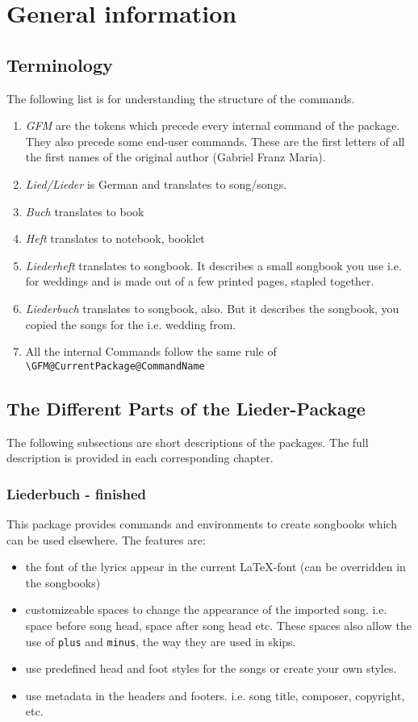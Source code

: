 \documentclass[12pt,a4paper]{scrreprt}
\begin{document}
\chapter{General information}
\section{Terminology}
The following list is for understanding the structure of the commands.
\begin{enumerate}
\item \emph{GFM} are the tokens which precede every internal command of the package. They also precede some end-user commands. These are the first letters of all the first names of the original author (Gabriel Franz Maria).
\item \emph{Lied/Lieder} is German and translates to song/songs.
\item \emph{Buch} translates to book
\item \emph{Heft} translates to notebook, booklet
\item \emph{Liederheft} translates to songbook. It describes a small songbook you use i.e. for weddings and is made out of a few printed pages, stapled together.
\item \emph{Liederbuch} translates to songbook, also. But it describes the songbook, you copied the songs for the  i.e. wedding from.
\item All the internal Commands follow the same rule of \verb+\GFM@CurrentPackage@CommandName+
\end{enumerate}





\section{The Different Parts of the Lieder-Package}
The following subsections are short descriptions of the packages. The full description is provided in each corresponding chapter.
\subsection{Liederbuch - finished} 
This package provides commands and environments to create songbooks which can be used elsewhere. The features are:
\begin{itemize}
\item the font of the lyrics appear in the current \LaTeX -font (can be overridden in the songbooks)
\item customizeable spaces to change the appearance of the imported song. i.e. space before song head, space after song head etc. These spaces also allow the use of \verb+plus+ and \verb+minus+, the way they are used in skips.
\item use predefined head and foot styles for the songs or create your own styles.
\item use metadata in the headers and footers. i.e. song title, composer, copyright, etc.
\end{itemize}
\end{document}
